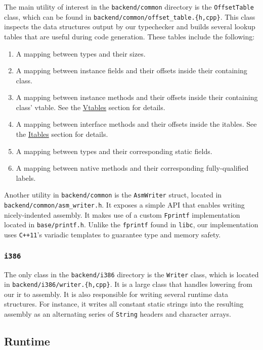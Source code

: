 \documentclass[12pt, titlepage]{article}
\newcommand{\z}[1]{\texttt{#1}}
\begin{document}
The main utility of interest in the \z{backend/common} directory is the
\z{OffsetTable} class, which can be found in
\z{backend/common/offset\_table.\{h,cpp\}}. This class inspects the data
structures output by our typechecker and builds several lookup tables that are
useful during code generation. These tables include the following:
\begin{enumerate}
  \item A mapping between types and their sizes.
  \item A mapping between instance fields and their offsets inside their
    containing class.
  \item A mapping between instance methods and their offsets inside their
    containing class' vtable. See the \hyperref[subsubsec:vtables]{Vtables}
    section for details.
  \item A mapping between interface methods and their offsets inside the
    itables. See the \hyperref[subsubsec:itables]{Itables} section for details.
  \item A mapping between types and their corresponding static fields.
  \item A mapping between native methods and their corresponding
    fully-qualified labels.
\end{enumerate}

Another utility in \z{backend/common} is the \z{AsmWriter} struct, located in
\z{backend/common/asm\_writer.h}. It exposes a simple API that enables writing
nicely-indented assembly. It makes use of a custom \z{Fprintf} implementation
located in \z{base/printf.h}. Unlike the \z{fprintf} found in \z{libc}, our
implementation uses \z{C++11}'s variadic templates to guarantee type and memory
safety.

\subsubsection{\z{i386}}\label{subsubsec:i386}

The only class in the \z{backend/i386} directory is the \z{Writer} class, which
is located in \z{backend/i386/writer.\{h,cpp\}}. It is a large class that
handles lowering from our \ac{ir} to assembly. It is also responsible for
writing several runtime data structures. For instance, it writes all constant
static strings into the resulting assembly as an alternating series of
\z{String} headers and character arrays.

\subsection{Runtime}\label{subsec:runtime}
\end{document}
